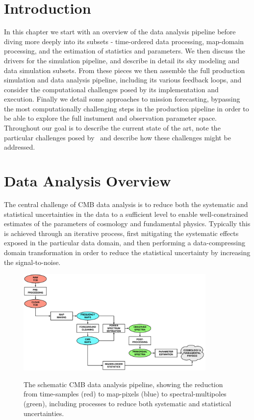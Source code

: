 \section{Introduction}

In this chapter we start with an overview of the data analysis pipeline before diving more deeply into its subsets - time-ordered data processing, map-domain processing, and the estimation of statistics and parameters. We then discuss the drivers for the simulation pipeline, and describe in detail its sky modeling and data simulation subsets. From these pieces we then assemble the full production simulation and data analysis pipeline, including its various feedback loops, and consider the computational challenges posed by its implementation and execution. Finally we detail some approaches to mission forecasting, bypassing the most computationally challenging steps in the production pipeline in order to be able to explore the full instument and observation parameter space. Throughout our goal is to describe the current state of the art, note the particular challenges posed by \cmbexp\, and describe how these challenges might be addressed. 

\section{Data Analysis Overview}

The central challenge of CMB data analysis is to reduce both the systematic and statistical uncertainties in the data to a sufficient level to enable well-constrained estimates of the parameters of cosmology and fundamental physics. Typically this is achieved through an iterative process, first mitigating the systematic effects exposed in the particular data domain, and then performing a data-compressing domain transformation in order to reduce the statistical uncertainty by increasing the signal-to-noise.

\begin{figure}[htbp]
\hspace{0.75in}\includegraphics[width=0.875\textwidth]{Analysis/da}\\
\caption{The schematic CMB data analysis pipeline, showing the reduction from time-samples (red) to map-pixels (blue) to spectral-multipoles (green), including processes to reduce both systematic and statistical uncertainties.}
\label{fig_da}
\end{figure}

